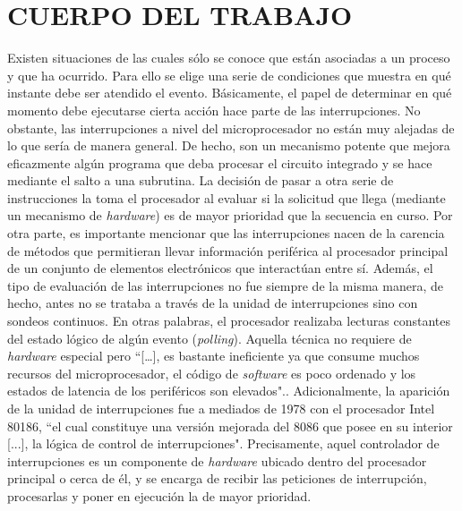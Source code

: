 \documentclass[11pt,letterpaper]{article}
\begin{document}

\section{CUERPO DEL TRABAJO}
Existen situaciones de las cuales sólo se conoce que están asociadas a un proceso y que ha ocurrido. Para ello se elige una serie de condiciones que muestra en qué instante debe ser atendido el evento. Básicamente, el papel de determinar en qué momento debe ejecutarse cierta acción hace parte de las interrupciones.
\newline
\newline
No obstante, las interrupciones a nivel del microprocesador no están muy alejadas de lo que sería de manera general. De hecho, son un mecanismo potente que mejora eficazmente algún programa que deba procesar el circuito integrado y se hace mediante el salto a una subrutina. La decisión de pasar a otra serie de instrucciones la toma el procesador al evaluar si la solicitud que llega (mediante un mecanismo de \textit{hardware}) es de mayor prioridad que la secuencia en curso.
\newline
\newline
Por otra parte, es importante mencionar que las interrupciones nacen de la carencia de métodos que permitieran llevar información periférica al procesador principal de un conjunto de elementos electrónicos que interactúan entre sí. Además, el tipo de evaluación de las interrupciones no fue siempre de la misma manera, de hecho, antes no se trataba a través de la unidad de interrupciones sino con sondeos continuos. En otras palabras, el procesador realizaba lecturas constantes del estado lógico de algún evento (\textit{polling}). Aquella técnica no requiere de \textit{hardware} especial pero ``[…], es bastante ineficiente ya que consume muchos recursos del microprocesador, el código de \textit{software} es poco ordenado y los estados de latencia de los periféricos son elevados".\cite{c8}.
\newline
\newline
Adicionalmente, la aparición de la unidad de interrupciones fue a mediados de 1978 con el procesador Intel 80186, ``el cual constituye una versión mejorada del 8086 que posee en su interior [...], la lógica de control de interrupciones"\cite{c7}. Precisamente, aquel controlador de interrupciones es un componente de \textit{hardware} ubicado dentro del procesador principal o cerca de él, y se encarga de recibir las peticiones de interrupción, procesarlas y poner en ejecución la de mayor prioridad.
\end{document}
